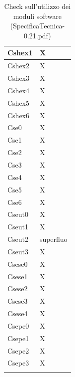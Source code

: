 \begin{footnotesize}
\begin{longtable}{|p{}|p{}|}
 Cshex1 &X  \\ \hline
 Cshex2 &X  \\ \hline
 Cshex3 &X  \\ \hline
 Cshex4 &X  \\ \hline
 Cshex5 &X  \\ \hline
 Cshex6 &X  \\ \hline
 Cse0 &X  \\ \hline
 Cse1 &X  \\ \hline
 Cse2 &X  \\ \hline
 Cse3 &X  \\ \hline
 Cse4 &X  \\ \hline
 Cse5 &X  \\ \hline
 Cse6 &X  \\ \hline
 Cseut0 &X  \\ \hline
 Cseut1 &X  \\ \hline
 Cseut2 &superfluo  \\ \hline
 Cseut3 &X  \\ \hline
 Csese0 &X  \\ \hline
 Csese1 &X  \\ \hline
 Csese2 &X  \\ \hline
 Csese3 &X  \\ \hline
 Csese4 &X  \\ \hline
 Csepe0 &X  \\ \hline
 Csepe1 &X  \\ \hline
 Csepe2 &X  \\ \hline
 Csepe3 &X  \\ \hline

\caption{Check sull'utilizzo dei moduli software (SpecificaTecnica-0.21.pdf)}
\end{longtable}
\end{footnotesize}

